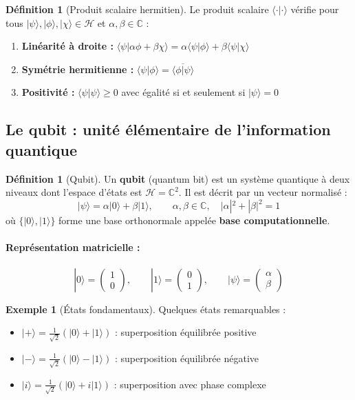 \documentclass[12pt,a4paper]{article}
\theoremstyle{definition}
\newtheorem{definition}[theorem]{Définition}
\newtheorem{example}[theorem]{Exemple}
\theoremstyle{remark}
\begin{document}
\begin{definition}[Produit scalaire hermitien]
Le produit scalaire $\langle \cdot | \cdot \rangle$ vérifie pour tous $|\psi\rangle, |\phi\rangle, |\chi\rangle \in \mathcal{H}$ et $\alpha, \beta \in \mathbb{C}$ :
\begin{enumerate}
    \item \textbf{Linéarité à droite :} $\langle \psi | \alpha\phi + \beta\chi \rangle = \alpha\langle \psi | \phi \rangle + \beta\langle \psi | \chi \rangle$
    \item \textbf{Symétrie hermitienne :} $\langle \psi | \phi \rangle = \overline{\langle \phi | \psi \rangle}$
    \item \textbf{Positivité :} $\langle \psi | \psi \rangle \geq 0$ avec égalité si et seulement si $|\psi\rangle = 0$
\end{enumerate}
\end{definition}

\subsection{Le qubit : unité élémentaire de l'information quantique}

\begin{definition}[Qubit]
Un \textbf{qubit} (quantum bit) est un système quantique à deux niveaux dont l'espace d'états est $\mathcal{H} = \mathbb{C}^2$. Il est décrit par un vecteur normalisé :
\[
|\psi\rangle = \alpha|0\rangle + \beta|1\rangle, \qquad \alpha, \beta \in \mathbb{C}, \quad |\alpha|^2 + |\beta|^2 = 1
\]
où $\{|0\rangle, |1\rangle\}$ forme une base orthonormale appelée \textbf{base computationnelle}.
\end{definition}

\paragraph{Représentation matricielle :}
\[
|0\rangle = \begin{pmatrix} 1 \\ 0 \end{pmatrix}, \qquad |1\rangle = \begin{pmatrix} 0 \\ 1 \end{pmatrix}, \qquad |\psi\rangle = \begin{pmatrix} \alpha \\ \beta \end{pmatrix}
\]

\begin{example}[États fondamentaux]
Quelques états remarquables :
\begin{itemize}
    \item $|+\rangle = \frac{1}{\sqrt{2}}(|0\rangle + |1\rangle)$ : superposition équilibrée positive
    \item $|-\rangle = \frac{1}{\sqrt{2}}(|0\rangle - |1\rangle)$ : superposition équilibrée négative
    \item $|i\rangle = \frac{1}{\sqrt{2}}(|0\rangle + i|1\rangle)$ : superposition avec phase complexe
\end{itemize}
\end{example}
\end{document}
